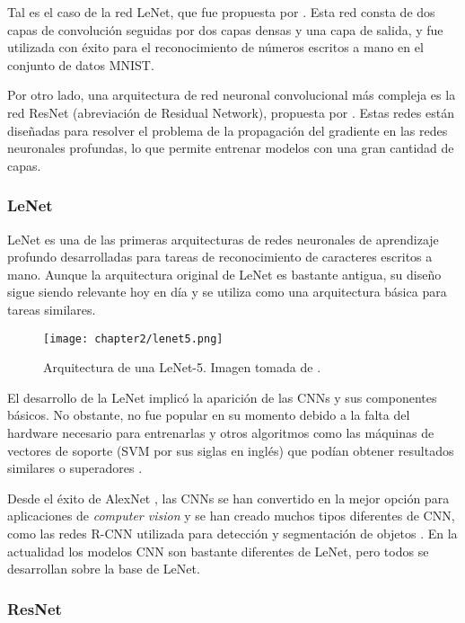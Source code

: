 Tal es el caso de la red LeNet, que fue propuesta por \cite{lecun1998gradient}. Esta red consta de dos capas de
convolución seguidas por dos capas densas y una capa de salida, y fue utilizada con éxito para el reconocimiento de
números escritos a mano en el conjunto de datos MNIST.

Por otro lado, una arquitectura de red neuronal convolucional más compleja es la red ResNet (abreviación de Residual
Network), propuesta por \cite{he2016deep}. Estas redes están diseñadas para resolver el problema de la propagación del
gradiente en las redes neuronales profundas, lo que permite entrenar modelos con una gran cantidad de capas.

\subsubsection{LeNet}
LeNet es una de las primeras arquitecturas de redes neuronales de aprendizaje profundo desarrolladas para tareas de
reconocimiento de caracteres escritos a mano. Aunque la arquitectura original de LeNet es bastante antigua, su diseño
sigue siendo relevante hoy en día y se utiliza como una arquitectura básica para tareas similares.

\begin{figure}[H]
    \centering
    \texttt{[image: chapter2/lenet5.png]}

    \caption{Arquitectura de una LeNet-5. Imagen tomada de \cite{lecun1998gradient}.}
    \label{fig:lenet}
\end{figure}

El desarrollo de la LeNet implicó la aparición de las CNNs y sus componentes básicos. No obstante, no fue popular en su
momento debido a la falta del hardware necesario para entrenarlas y otros algoritmos como las máquinas de vectores de
soporte (SVM por sus siglas en inglés) que podían obtener resultados similares o superadores \parencite{lecun1998gradient, decoste2002training, lauer2007trainable}.

Desde el éxito de AlexNet \parencite{krizhevsky2017imagenet}, las CNNs se han convertido en la mejor opción para aplicaciones de {\it computer
        vision} y se han creado muchos tipos diferentes de CNN, como las redes R-CNN utilizada para detección y segmentación de
objetos \parencite{girshick2014rich}. En la actualidad los modelos CNN son bastante diferentes de LeNet, pero todos se desarrollan
sobre la base de LeNet.

\subsubsection{ResNet}

